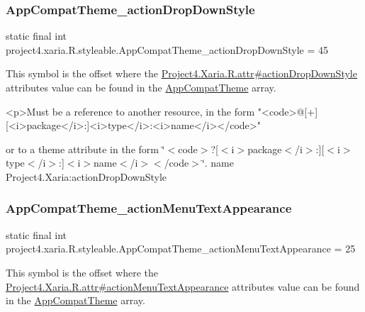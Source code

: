 \subsubsection{\texorpdfstring{App\+Compat\+Theme\+\_\+action\+Drop\+Down\+Style}{AppCompatTheme\_actionDropDownStyle}}
{\footnotesize\ttfamily static final int project4.\+xaria.\+R.\+styleable.\+App\+Compat\+Theme\+\_\+action\+Drop\+Down\+Style = 45\hspace{0.3cm}{\ttfamily [static]}}

This symbol is the offset where the \hyperlink{}{Project4.\+Xaria.\+R.\+attr\#action\+Drop\+Down\+Style} attribute\textquotesingle{}s value can be found in the \hyperlink{classproject4_1_1xaria_1_1R_1_1styleable_aad8bec413e2350f9404e6ff0e831a85d}{App\+Compat\+Theme} array.

\begin{DoxyVerb}      <p>Must be a reference to another resource, in the form "<code>@[+][<i>package</i>:]<i>type</i>:<i>name</i></code>"
\end{DoxyVerb}
 or to a theme attribute in the form \char`\"{}$<$code$>$?\mbox{[}$<$i$>$package$<$/i$>$\+:\mbox{]}\mbox{[}$<$i$>$type$<$/i$>$\+:\mbox{]}$<$i$>$name$<$/i$>$$<$/code$>$\char`\"{}.  name Project4.\+Xaria\+:action\+Drop\+Down\+Style \mbox{\label{classproject4_1_1xaria_1_1R_1_1styleable_aaf321468ea719fc98d678e0a033cf5b4}} 
\subsubsection{\texorpdfstring{App\+Compat\+Theme\+\_\+action\+Menu\+Text\+Appearance}{AppCompatTheme\_actionMenuTextAppearance}}
{\footnotesize\ttfamily static final int project4.\+xaria.\+R.\+styleable.\+App\+Compat\+Theme\+\_\+action\+Menu\+Text\+Appearance = 25\hspace{0.3cm}{\ttfamily [static]}}

This symbol is the offset where the \hyperlink{}{Project4.\+Xaria.\+R.\+attr\#action\+Menu\+Text\+Appearance} attribute\textquotesingle{}s value can be found in the \hyperlink{classproject4_1_1xaria_1_1R_1_1styleable_aad8bec413e2350f9404e6ff0e831a85d}{App\+Compat\+Theme} array.

